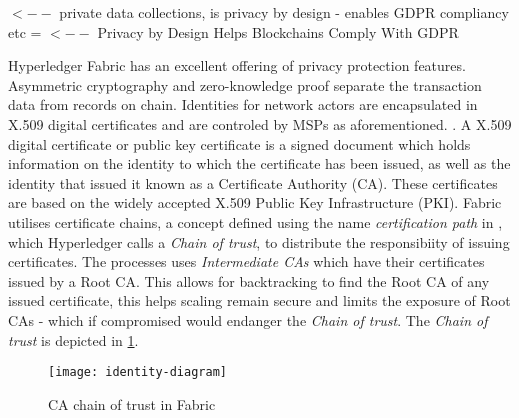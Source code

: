 \cite{noauthor_private_nodate} $<--$ private data collections, is privacy by design - enables GDPR compliancy etc = \cite{narumanchi_privacy_2019} $<--$ Privacy by Design Helps Blockchains Comply With GDPR

Hyperledger Fabric has an excellent offering of privacy protection features.
Asymmetric cryptography and zero-knowledge proof separate the transaction data from records on chain. 
Identities for network actors are encapsulated in X.509 digital certificates and are controled by MSPs as aforementioned. \cite{noauthor_identity_nodate}. 
A X.509 digital certificate or public key certificate is a signed document which holds information on the identity to which the certificate has been issued, as well as the identity that issued it known as a Certificate Authority (CA). 
These certificates are based on the widely accepted X.509 Public Key Infrastructure (PKI). \cite{cooper_internet_nodate}
Fabric utilises certificate chains, a concept defined using the name \emph{certification path} in \cite{cooper_internet_nodate}, which Hyperledger calls a \emph{Chain of trust}, to distribute the responsibiity of issuing certificates. 
The processes uses \emph{Intermediate CAs} which have their certificates issued by a Root CA. 
This allows for backtracking to find the Root CA of any issued certificate, this helps scaling remain secure and limits the exposure of Root CAs - which if compromised would endanger the \emph{Chain of trust}. \cite{noauthor_identity_nodate}
The \emph{Chain of trust} is depicted in \ref{fig:trustchain}.
\begin{figure}[H]
  \texttt{[image: identity-diagram]}
  \caption{CA chain of trust in Fabric}
  \label{fig:trustchain}
\end{figure}



